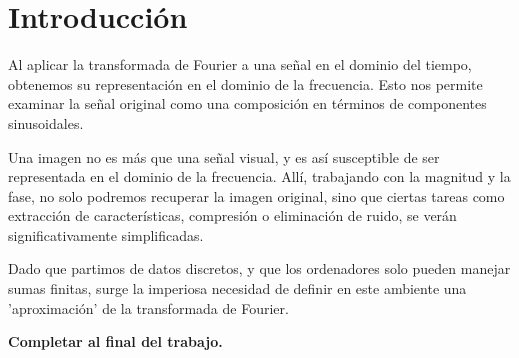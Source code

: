 %


\chapter{Introducción}

\noindent Al aplicar la transformada de Fourier a una señal en el dominio del tiempo, obtenemos su representación en el dominio de la frecuencia. Esto nos permite examinar la señal original como una composición en términos de componentes sinusoidales.

\noindent Una imagen no es más que una señal visual, y es así susceptible de ser representada en el dominio de la frecuencia. Allí, trabajando con la magnitud y la fase, no solo podremos recuperar la imagen original, sino que ciertas tareas como extracción de características, compresión o  eliminación de ruido, se verán significativamente simplificadas.

\noindent Dado que partimos de datos discretos, y que los ordenadores solo pueden manejar sumas finitas, surge la  imperiosa necesidad de definir en este ambiente una 'aproximación' de la transformada de Fourier.


\noindent \textbf{Completar al final del trabajo.}


\endinput
